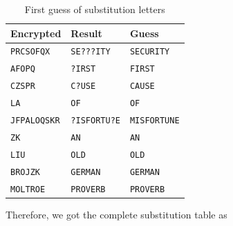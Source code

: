                 \begin{table}[h]
                    \centering
                    \begin{tabular}{|l|l|l|}
                        \toprule
                        Encrypted & Result & Guess \\
                        \midrule
                        \texttt{PRCSOFQX} & \texttt{SE???ITY} & \texttt{SECURITY} \\
                        \texttt{AFOPQ} & \texttt{?IRST} & \texttt{FIRST} \\
                        \texttt{CZSPR} & \texttt{C?USE} & \texttt{CAUSE} \\
                        \texttt{LA} & \texttt{OF} & \texttt{OF} \\
                        \texttt{JFPALOQSKR} & \texttt{?ISFORTU?E} & \texttt{MISFORTUNE} \\
                        \texttt{ZK} & \texttt{AN} & \texttt{AN} \\
                        \texttt{LIU} & \texttt{OLD} & \texttt{OLD} \\
                        \texttt{BROJZK} & \texttt{GERMAN} & \texttt{GERMAN} \\
                        \texttt{MOLTROE} & \texttt{PROVERB} & \texttt{PROVERB} \\
                        \bottomrule
                    \end{tabular}
                    \caption{First guess of substitution letters}
                    \label{tab:first_sub_table}
                \end{table}

    \pagebreak

                Therefore, we got the complete substitution table as

